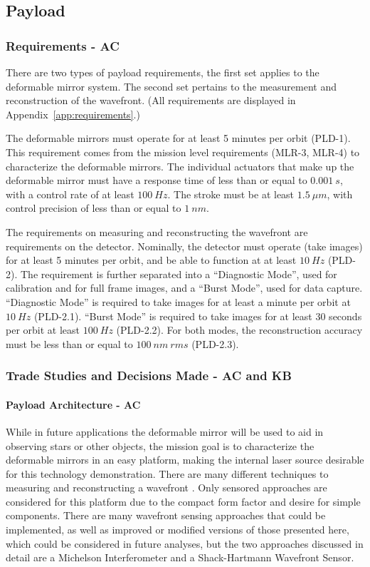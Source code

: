 \documentclass[12pt]{article}
\begin{document}

		\subsection{Payload}

			\subsubsection{Requirements - AC}
There are two types of payload requirements, the first set applies to the deformable mirror system.  The second set pertains to the measurement and reconstruction of the wavefront.  (All requirements are displayed in Appendix~\ref{app:requirements}.) 

The deformable mirrors must operate for at least 5 minutes per orbit (PLD-1).  This requirement comes from the mission level requirements (MLR-3, MLR-4) to characterize the deformable mirrors.  The individual actuators that make up the deformable mirror must have a response time of less than or equal to $0.001\ s$, with a control rate of at least $100\ Hz$.  The stroke must be at least $1.5\ \mu m$, with control precision of less than or equal to $1\ nm$.

The requirements on measuring and reconstructing the wavefront are requirements on the detector.  Nominally, the detector must operate (take images) for at least 5 minutes per orbit, and be able to function at at least $10\ Hz$ (PLD-2). The requirement is further separated into a “Diagnostic Mode”, used for calibration and for full frame images, and a “Burst Mode”, used for data capture.  “Diagnostic Mode” is required to take images for at least a minute per orbit at $10\ Hz$ (PLD-2.1).  “Burst Mode” is required to take images for at least 30 seconds per orbit at least $100\ Hz$ (PLD-2.2).  For both modes, the reconstruction accuracy must be less than or equal to $100\ nm\ rms$ (PLD-2.3).

			\subsubsection{Trade Studies and Decisions Made - AC and KB}

\paragraph{Payload Architecture - AC}

While in future applications the deformable mirror will be used to aid in observing stars or other objects, the mission goal is to characterize the deformable mirrors in an easy platform, making the internal laser source desirable for this technology demonstration. There are many different techniques to measuring and reconstructing a wavefront \cite{FGadaptiveoptics}. Only sensored approaches are considered for this platform due to the compact form factor and desire for simple components. There are many wavefront sensing approaches that could be implemented, as well as improved or modified versions of those presented here, which could be considered in future analyses, but the two approaches discussed in detail are a Michelson Interferometer and a Shack-Hartmann Wavefront Sensor.
\end{document}
